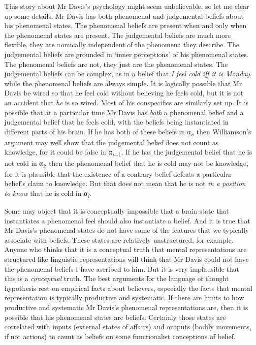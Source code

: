\documentclass[
  11pt,
  letterpaper,
  DIV=11,
  numbers=noendperiod,
  twoside]{scrartcl}
\begin{document}
This story about Mr Davis's psychology might seem unbelievable, so let
me clear up some details. Mr Davis has both phenomenal and judgemental
beliefs about his phenomenal states. The phenomenal beliefs are present
when and only when the phenomenal states are present. The judgemental
beliefs are much more flexible, they are nomically independent of the
phenomena they describe. The judgemental beliefs are grounded in `inner
perceptions' of his phenomenal states. The phenomenal beliefs are not,
they just are the phenomenal states. The judgemental beliefs can be
complex, as in a belief that \emph{I feel cold iff it is Monday}, while
the phenomenal beliefs are always simple. It is logically possible that
Mr Davis be wired so that he feel cold without believing he feels cold,
but it is not an accident that \emph{he} is so wired. Most of his
conspecifics are similarly set up. It is possible that at a particular
time Mr Davis has \emph{both} a phenomenal belief and a judgemental
belief that he feels cold, with the beliefs being instantiated in
different parts of his brain. If he has both of these beliefs in
α\textsubscript{\emph{i}}, then Williamson's argument may well show that
the judgemental belief does not count as knowledge, for it could be
false in α\textsubscript{\emph{i}+1}. If he has the judgemental belief
that he is not cold in α\textsubscript{\emph{i}}, then the phenomenal
belief that he is cold may not be knowledge, for it is plausible that
the existence of a contrary belief defeats a particular belief's claim
to knowledge. But that does not mean that he is not \emph{in a position
to know} that he is cold in α\textsubscript{\emph{i}}.

Some may object that it is conceptually impossible that a brain state
that instantiates a phenomenal feel should also instantiate a belief.
And it is true that Mr Davis's phenomenal states do not have some of the
features that we typically associate with beliefs. These states are
relatively unstructured, for example. Anyone who thinks that it is a
conceptual truth that mental representations are structured like
linguistic representations will think that Mr Davis could not have the
phenomenal beliefs I have ascribed to him. But it is very implausible
that this is a \emph{conceptual} truth. The best arguments for the
language of thought hypothesis rest on empirical facts about believers,
especially the facts that mental representation is typically productive
and systematic. If there are limits to how productive and systematic Mr
Davis's phenomenal representations are, then it is possible that his
phenomenal states are beliefs. Certainly those states are correlated
with inputs (external states of affairs) and outputs (bodily movements,
if not actions) to count as beliefs on some functionalist conceptions of
belief.
\end{document}
